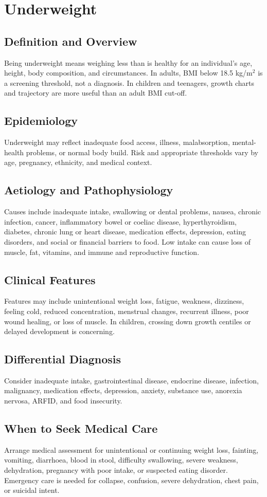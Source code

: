 \chapter{Underweight}
\section*{Definition and Overview}
Being underweight means weighing less than is healthy for an individual's age, height, body composition, and circumstances. In adults, BMI below 18.5 kg/m$^2$ is a screening threshold, not a diagnosis. In children and teenagers, growth charts and trajectory are more useful than an adult BMI cut-off.
\section*{Epidemiology}
Underweight may reflect inadequate food access, illness, malabsorption, mental-health problems, or normal body build. Risk and appropriate thresholds vary by age, pregnancy, ethnicity, and medical context.
\section*{Aetiology and Pathophysiology}
Causes include inadequate intake, swallowing or dental problems, nausea, chronic infection, cancer, inflammatory bowel or coeliac disease, hyperthyroidism, diabetes, chronic lung or heart disease, medication effects, depression, eating disorders, and social or financial barriers to food. Low intake can cause loss of muscle, fat, vitamins, and immune and reproductive function.
\section*{Clinical Features}
Features may include unintentional weight loss, fatigue, weakness, dizziness, feeling cold, reduced concentration, menstrual changes, recurrent illness, poor wound healing, or loss of muscle. In children, crossing down growth centiles or delayed development is concerning.
\section*{Differential Diagnosis}
Consider inadequate intake, gastrointestinal disease, endocrine disease, infection, malignancy, medication effects, depression, anxiety, substance use, anorexia nervosa, ARFID, and food insecurity.
\section*{When to Seek Medical Care}
Arrange medical assessment for unintentional or continuing weight loss, fainting, vomiting, diarrhoea, blood in stool, difficulty swallowing, severe weakness, dehydration, pregnancy with poor intake, or suspected eating disorder. Emergency care is needed for collapse, confusion, severe dehydration, chest pain, or suicidal intent.
